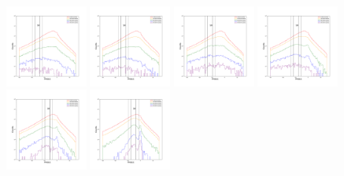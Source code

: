 \documentclass[12pt,prd]{article}
\begin{document}
\begin{figure}[h!]
\includegraphics[width=0.24\textwidth]{../figures/scanning_plotsgaiascan_l45_0_b82_2_ra201_5_dec28_5_npy_4.pdf}
\includegraphics[width=0.24\textwidth]{../figures/scanning_plotsgaiascan_l45_0_b82_2_ra201_5_dec28_5_npy_5.pdf}
\includegraphics[width=0.24\textwidth]{../figures/scanning_plotsgaiascan_l45_0_b82_2_ra201_5_dec28_5_npy_6.pdf}
\includegraphics[width=0.24\textwidth]{../figures/scanning_plotsgaiascan_l45_0_b82_2_ra201_5_dec28_5_npy_7.pdf}
\includegraphics[width=0.24\textwidth]{../figures/scanning_plotsgaiascan_l45_0_b82_2_ra201_5_dec28_5_npy_8.pdf}
\includegraphics[width=0.24\textwidth]{../figures/scanning_plotsgaiascan_l45_0_b82_2_ra201_5_dec28_5_npy_9.pdf}

\end{figure}
\end{document}

